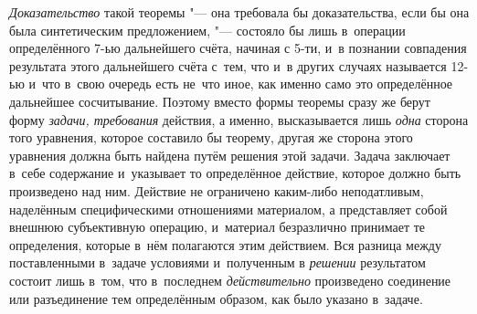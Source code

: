 {\em Доказательство} такой теоремы "--- она требовала бы доказательства, если
бы она была синтетическим предложением, "--- состояло бы лишь в~операции
определённого 7-ью дальнейшего счёта, начиная с 5-ти, и~в познании
совпадения результата этого дальнейшего счёта с~тем, что и~в других случаях
называется 12-ью и~что в~свою очередь есть не~что иное, как именно само это
определённое дальнейшее сосчитывание. Поэтому вместо формы теоремы сразу же
берут форму {\em задачи, требования} действия,
а именно, высказывается лишь {\em одна}
сторона того уравнения, которое составило бы теорему, другая
же сторона этого уравнения должна быть найдена путём решения этой задачи.
Задача заключает в~себе содержание и~указывает то определённое действие,
которое должно быть произведено над ним. Действие не ограничено каким-либо
неподатливым, наделённым специфическими отношениями материалом, а
представляет собой внешнюю субъективную операцию, и~материал безразлично
принимает те определения, которые в~нём полагаются этим действием. Вся
разница между поставленными в~задаче условиями и~полученным в {\em решении}
результатом состоит лишь в~том, что в~последнем {\em действительно}
произведено соединение или разъединение тем определённым
образом, как было указано в~задаче.

